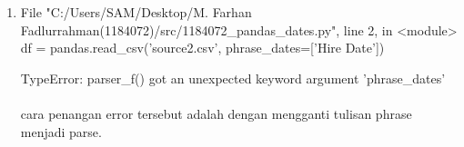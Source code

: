 \documentclass[12pt]{article}
\begin{document}
\begin{enumerate}
	\item File "C:/Users/SAM/Desktop/M. Farhan Fadlurrahman(1184072)/src/1184072\_pandas\_dates.py", line 2, in <module>
    df = pandas.read\_csv('source2.csv', phrase\_dates=['Hire Date'])

TypeError: parser\_f() got an unexpected keyword argument 'phrase\_dates'
\paragraph*{}	cara penangan error tersebut adalah dengan mengganti tulisan phrase menjadi parse.
	
\end{enumerate}
\end{document}
